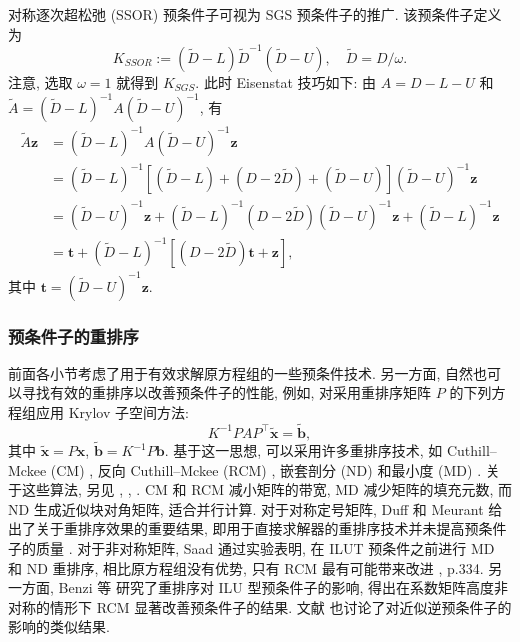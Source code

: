 {对称逐次超松弛 (SSOR) 预条件子可视为 SGS 预条件子的推广. 该预条件子定义为}
\[K_{SSOR}:=(\widetilde D-L)\widetilde D^{-1}(\widetilde D-U),\quad\widetilde D=D/\omega.\]
{注意, 选取 $\omega=1$ 就得到 $K_{SGS}$. 此时 Eisenstat 技巧如下: 由 $A=D-L-U$ 和 $\widetilde A=(\widetilde D-L)^{-1}A(\widetilde D-U)^{-1}$, 有}
\[\begin{aligned}\widetilde A\bm z&=(\widetilde D-L)^{-1}A(\widetilde D-U)^{-1}\bm z\\
&=(\widetilde D-L)^{-1}[(\widetilde D-L)+(D-2\widetilde D)+(\widetilde D-U)](\widetilde D-U)^{-1}\bm z\\
&=(\widetilde D-U)^{-1}\bm z+(\widetilde D-L)^{-1}(D-2\widetilde D)(\widetilde D-U)^{-1}\bm z+(\widetilde D-L)^{-1}\bm z\\
&=\bm t+(\widetilde D-L)^{-1}[(D-2\widetilde D)\bm t+\bm z],\end{aligned}\]
{其中 $\bm t=(\widetilde D-U)^{-1}\bm z$.}
\subsubsection{{预条件子的重排序}}\label{subsec:preconditioner-reorderings}
{前面各小节考虑了用于有效求解原方程组的一些预条件技术. 另一方面, 自然也可以寻找有效的重排序以改善预条件子的性能, 例如, 对采用重排序矩阵 $P$ 的下列方程组应用 Krylov 子空间方法:}
\[K^{-1}PAP^{\top}\widetilde{\bm x}=\widetilde{\bm b},\]
{其中 $\widetilde{\bm x}=P\bm x$, $\widetilde{\bm b}=K^{-1}P\bm b$. 基于这一思想, 可以采用许多重排序技术, 如 Cuthill--Mckee (CM) , 反向 Cuthill--Mckee (RCM) , 嵌套剖分 (ND)  和最小度 (MD) . 关于这些算法, 另见 , , . CM 和 RCM 减小矩阵的带宽, MD 减少矩阵的填充元数, 而 ND 生成近似块对角矩阵, 适合并行计算.}
{对于对称定号矩阵, Duff 和 Meurant 给出了关于重排序效果的重要结果, 即用于直接求解器的重排序技术并未提高预条件子的质量 .}
{对于非对称矩阵, Saad 通过实验表明, 在 ILUT 预条件之前进行 MD 和 ND 重排序, 相比原方程组没有优势, 只有 RCM 最有可能带来改进 , p.334. 另一方面, Benzi 等  研究了重排序对 ILU 型预条件子的影响, 得出在系数矩阵高度非对称的情形下 RCM 显著改善预条件子的结果. 文献  也讨论了对近似逆预条件子的影响的类似结果.}

